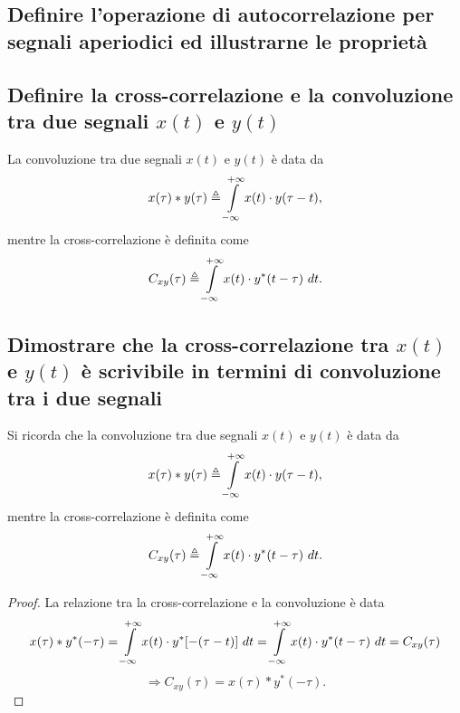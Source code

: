 \documentclass[12pt,oneside,openany]{memoir}
\numberwithin{equation}{subsection}
\newcommand{\dt}{\ dt}
\begin{document}
\subsection{Definire l'operazione di autocorrelazione per segnali aperiodici ed
illustrarne le propriet\`a}


\newpage
\subsection{Definire la cross-correlazione e la convoluzione tra due segnali
$x(t)$ e $y(t)$}
La convoluzione tra due segnali $x(t)$ e $y(t)$ \`e data da
\[
    x(\tau) * y(\tau) \triangleq \int\displaylimits_{-\infty}^{+\infty} x(t)
    \cdot y(\tau - t),
\]
mentre la cross-correlazione \`e definita come
\[
    C_{xy} (\tau) \triangleq \int\displaylimits_{-\infty}^{+\infty} x(t) \cdot
    y^*(t - \tau) \dt.
\]


\newpage
\subsection{Dimostrare che la cross-correlazione tra $x(t)$ e $y(t)$ \`e
scrivibile in termini di convoluzione tra i due segnali}
Si ricorda che la convoluzione tra due segnali $x(t)$ e $y(t)$ \`e data da
\[
    x(\tau) * y(\tau) \triangleq \int\displaylimits_{-\infty}^{+\infty} x(t)
    \cdot y(\tau - t),
\]
mentre la cross-correlazione \`e definita come
\[
    C_{xy} (\tau) \triangleq \int\displaylimits_{-\infty}^{+\infty} x(t) \cdot
    y^*(t - \tau) \dt.
\]
\begin{proof} La relazione tra la cross-correlazione e la convoluzione \`e data
\[
    x(\tau) * y^*(-\tau) = \int\displaylimits_{-\infty}^{+\infty} x(t) \cdot
    y^*[-(\tau - t)] \dt = \int\displaylimits_{-\infty}^{+\infty} x(t) \cdot
    y^*(t - \tau) \dt = C_{xy}(\tau)
\]
\[
    \Longrightarrow C_{xy}(\tau) = x(\tau) * y^*(-\tau).
\]
\end{proof}
\end{document}

